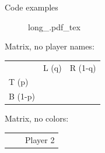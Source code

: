 \begin{frame}{Code examples}
  \begin{multicols}{2}
    \begin{figure}[!h]
      \center
      \def\svgwidth{.8\columnwidth}
      {long_.pdf_tex}
    \end{figure}
  \vfill\null \columnbreak
    Matrix, no player names:
    \vspace{-10pt}
    \begin{table} %
      \begin{tabular}{l|c|c|}
        \multicolumn{1}{c}{} & \multicolumn{1}{c}{L (q)} & \multicolumn{1}{c}{R (1-q)} \\\cline{2-3}
        T (p)   &  &  \\\cline{2-3}
        B (1-p) &  &  \\\cline{2-3}
      \end{tabular}
    \end{table}
    Matrix, no colors:
    \vspace{-10pt}
    \begin{table}
      \begin{tabular}{cl|c|c|} %
        & \multicolumn{1}{c}{} & \multicolumn{2}{c}{Player 2}\\ %

\end{tabular}
\end{table}
\end{multicols}
\end{frame}
